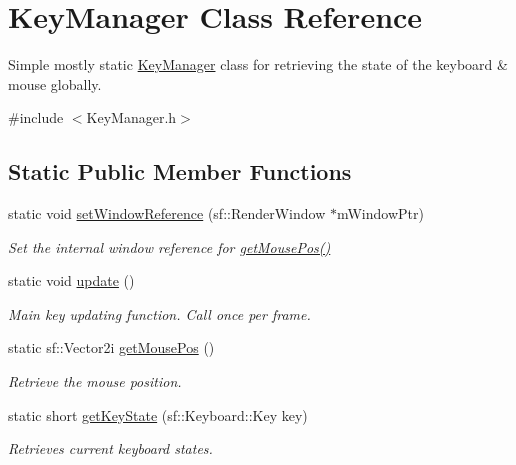 \hypertarget{class_key_manager}{}\section{Key\+Manager Class Reference}
\label{class_key_manager}


Simple mostly static \mbox{\hyperlink{class_key_manager}{Key\+Manager}} class for retrieving the state of the keyboard \& mouse globally.  




{\ttfamily \#include $<$Key\+Manager.\+h$>$}

\subsection*{Static Public Member Functions}
\begin{DoxyCompactItemize}
\item 
static void \mbox{\hyperlink{class_key_manager_acb062eff198aaa23e63cf07763e6b9ae}{set\+Window\+Reference}} (sf\+::\+Render\+Window $\ast$m\+Window\+Ptr)
\begin{DoxyCompactList}\small\item\em Set the internal window reference for \mbox{\hyperlink{class_key_manager_aae40b808bf243100e3da7e63fb8cebe5}{get\+Mouse\+Pos()}} \end{DoxyCompactList}\item 
\mbox{\label{class_key_manager_ab58d4b6587a7a83fe15c504be7424c2b}} 
static void \mbox{\hyperlink{class_key_manager_ab58d4b6587a7a83fe15c504be7424c2b}{update}} ()
\begin{DoxyCompactList}\small\item\em Main key updating function. Call once per frame. \end{DoxyCompactList}\item 
static sf\+::\+Vector2i \mbox{\hyperlink{class_key_manager_aae40b808bf243100e3da7e63fb8cebe5}{get\+Mouse\+Pos}} ()
\begin{DoxyCompactList}\small\item\em Retrieve the mouse position. \end{DoxyCompactList}\item 
static short \mbox{\hyperlink{class_key_manager_a6769c626a0ac7e919979e9128dfb6a88}{get\+Key\+State}} (sf\+::\+Keyboard\+::\+Key key)
\begin{DoxyCompactList}\small\item\em Retrieves current keyboard states. \end{DoxyCompactList}\end{DoxyCompactItemize}


